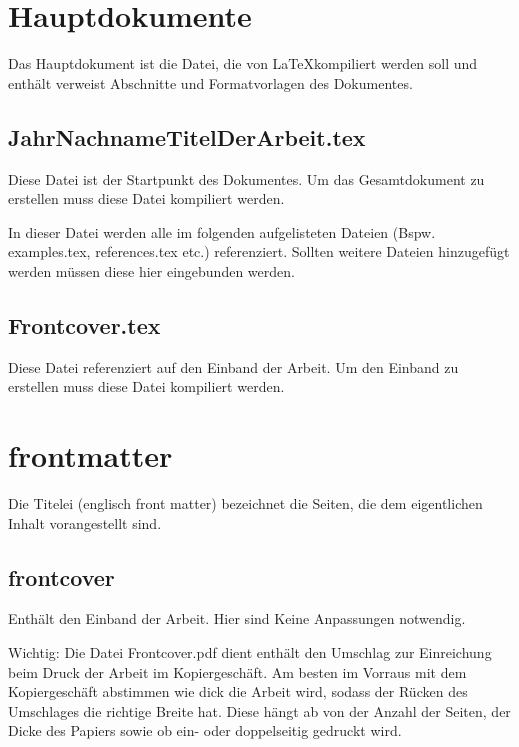 \newpage

\section*{Hauptdokumente}

Das Hauptdokument ist die Datei, die von \LaTeX kompiliert werden soll und enthält verweist Abschnitte und Formatvorlagen des Dokumentes.

\subsection*{JahrNachnameTitelDerArbeit.tex}

Diese Datei ist der Startpunkt des Dokumentes. Um das Gesamtdokument zu erstellen muss diese Datei kompiliert werden.

In dieser Datei werden alle im folgenden aufgelisteten Dateien (Bspw. examples.tex, references.tex etc.) referenziert. Sollten weitere Dateien hinzugefügt werden müssen diese hier eingebunden werden.

\subsection*{Frontcover.tex}

Diese Datei referenziert auf den Einband der Arbeit. Um den Einband zu erstellen muss diese Datei kompiliert werden.

\newpage

\section*{frontmatter}

Die Titelei (englisch front matter) bezeichnet die Seiten, die dem eigentlichen Inhalt vorangestellt sind. 

\subsection*{frontcover}
\label{section:_01_frontcover}

Enthält den Einband der Arbeit. Hier sind Keine Anpassungen notwendig.

Wichtig: Die Datei Frontcover.pdf dient enthält den Umschlag zur Einreichung beim Druck der Arbeit im Kopiergeschäft. Am besten im Vorraus mit dem Kopiergeschäft abstimmen wie dick die Arbeit wird, sodass der Rücken des Umschlages die richtige Breite hat. Diese hängt ab von der Anzahl der Seiten, der Dicke des Papiers sowie ob ein- oder doppelseitig gedruckt wird. 

